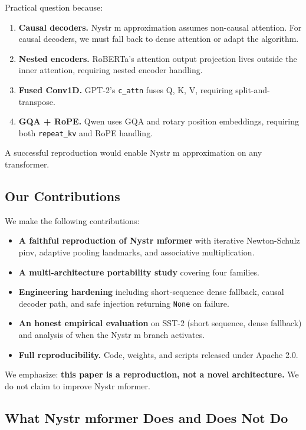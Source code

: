Practical question because:

\begin{enumerate}
\item \textbf{Causal decoders.} Nystr m approximation assumes non-causal attention.
  For causal decoders, we must fall back to dense attention or adapt the
  algorithm.
\item \textbf{Nested encoders.} RoBERTa's attention output projection lives outside
  the inner attention, requiring nested encoder handling.
\item \textbf{Fused Conv1D.} GPT-2's \texttt{c\_attn} fuses Q, K, V, requiring split-and-transpose.
\item \textbf{GQA + RoPE.} Qwen uses GQA and rotary position embeddings, requiring
  both \texttt{repeat\_kv} and RoPE handling.

\end{enumerate}
A successful reproduction would enable Nystr m approximation on any 
transformer.

\subsection{Our Contributions}

We make the following contributions:

\begin{itemize}
\item \textbf{A faithful reproduction of Nystr mformer} with iterative
  Newton-Schulz pinv, adaptive pooling landmarks, and associative
  multiplication.
\item \textbf{A multi-architecture portability study} covering four families.
\item \textbf{Engineering hardening} including short-sequence dense fallback,
  causal decoder path, and safe injection returning \texttt{None} on failure.
\item \textbf{An honest empirical evaluation} on SST-2 (short sequence, dense
  fallback) and analysis of when the Nystr m branch activates.
\item \textbf{Full reproducibility.} Code, weights, and scripts released under
  Apache 2.0.

\end{itemize}
We emphasize: \textbf{this paper is a reproduction, not a novel architecture.} 
We do not claim to improve Nystr mformer.

\subsection{What Nystr mformer Does and Does Not Do}

